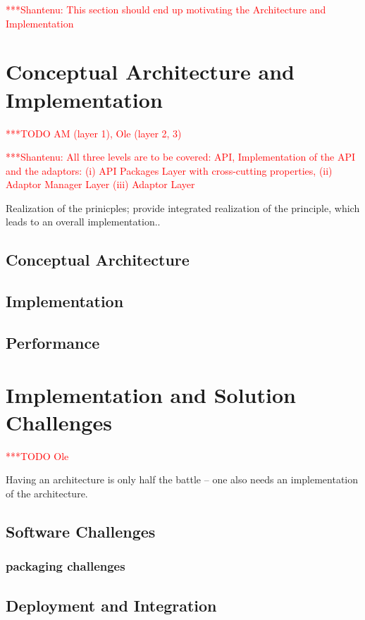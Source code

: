 \documentclass[a4paper,10pt]{article}
\newcommand{\todo}[1]{     {\textcolor{red}  { ***TODO      #1 }}}
\newcommand{\jhanote}[1]{  {\textcolor{red}  { ***Shantenu: #1 }}}
\newcommand{\todo}[1]{}
\newcommand{\jhanote}[1]{}
\begin{document}
\jhanote{This section should end up motivating the Architecture and
 Implementation}

\section{Conceptual Architecture and Implementation} \todo{AM (layer 1), Ole (layer 2, 3)}

\jhanote{All three levels are to be covered: API, Implementation of
  the API and the adaptors: (i) API Packages Layer with cross-cutting
  properties, (ii) Adaptor Manager Layer (iii) Adaptor Layer}

 Realization of the prinicples; provide integrated realization of the
 principle, which leads to an overall implementation..

 \subsection{Conceptual Architecture}

 \subsection{Implementation}

 \subsection{Performance}



\section{Implementation and Solution Challenges}\todo{Ole}

Having an architecture is only half the battle -- one also needs an
implementation of the architecture.


\subsection{Software Challenges}

\subsubsection{packaging challenges}
\subsection{Deployment and Integration} 
\end{document}
